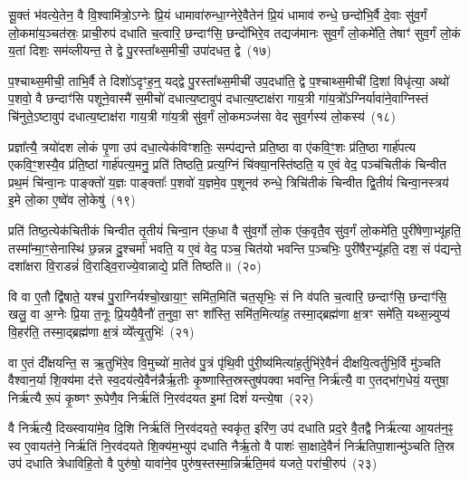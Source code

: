सू॒क्तं भ॑वत्ये॒तेन॒ वै वि॒श्वामि॑त्रो॒\-ऽग्नेः प्रि॒यं धामावा॑रुन्धा॒ग्नेरे॒वैतेन॑ प्रि॒यं धामाव॑ रुन्धे॒ छन्दो॑भि॒र्वै दे॒वाः सु॑व॒र्गं लो॒कमा॑य॒ञ्चत॑स्रः॒ प्राची॒रुप॑ दधाति च॒त्वारि॒ छन्दाꣳ॑सि॒ छन्दो॑भिरे॒व तद्यज॑मानः सुव॒र्गं लो॒कमे॑ति॒ तेषाꣳ॑ सुव॒र्गं लो॒कं य॒तां दिशः॒ सम॑व्लीयन्त॒ ते द्वे पु॒रस्ता᳚थ्स॒मीची॒ उपा॑दधत॒ द्वे~(१७)

प॒श्चाथ्स॒मीची॒ ताभि॒र्वै ते दिशो॑\-ऽदृꣳह॒न्॒ यद्द्वे पु॒रस्ता᳚थ्स॒मीची॑ उप॒दधा॑ति॒ द्वे प॒श्चाथ्स॒मीची॑ दि॒शां विधृ॑त्या॒ अथो॑ प॒शवो॒ वै छन्दाꣳ॑सि पशूने॒वास्मै॑ स॒मीचो॑ दधात्य॒ष्टावुप॑ दधात्य॒ष्टाक्ष॑रा गाय॒त्री गा॑य॒त्रो᳚\-ऽग्निर्यावा॑ने॒वाग्निस्तं चि॑नुते॒\-ऽष्टावुप॑ दधात्य॒ष्टाक्ष॑रा गाय॒त्री गा॑य॒त्री सु॑व॒र्गं लो॒कमञ्ज॑सा वेद सुव॒र्गस्य॑ लो॒कस्य॑~(१८)

प्रज्ञा᳚त्यै॒ त्रयो॑दश लोकं पृ॒णा उप॑ दधा॒त्येक॑विꣳशतिः॒ सम्प॑द्यन्ते प्रति॒ष्ठा वा ए॑कवि॒ꣳ॒शः प्र॑ति॒ष्ठा गार्\mbox{}ह॑पत्य एकवि॒ꣳ॒शस्यै॒व प्र॑ति॒ष्ठां गार्\mbox{}ह॑पत्य॒मनु॒ प्रति॑ तिष्ठति॒ प्रत्य॒ग्निं चि॑क्या॒नस्ति॑ष्ठति॒ य ए॒वं वेद॒ पञ्च॑चितीकं चिन्वीत प्रथ॒मं चि॑न्वा॒नः पाङ्क्तो॑ य॒ज्ञः पाङ्क्ताः᳚ प॒शवो॑ य॒ज्ञमे॒व प॒शूनव॑ रुन्धे॒ त्रिचि॑तीकं चिन्वीत द्वि॒तीयं॑ चिन्वा॒नस्त्रय॑ इ॒मे लो॒का ए॒ष्वे॑व लो॒केषु॑~(१९)

प्रति॑ तिष्ठ॒त्येक॑चितीकं चिन्वीत तृ॒तीयं॑ चिन्वा॒न ए॑क॒धा वै सु॑व॒र्गो लो॒क ए॑क॒वृतै॒व सु॑व॒र्गं लो॒कमे॑ति॒ पुरी॑षेणा॒भ्यू॑हति॒ तस्मा᳚न्मा॒ꣳ॒सेनास्थि॑ छ॒न्नन्न दु॒श्चर्मा॑ भवति॒ य ए॒वं वेद॒ पञ्च॒ चित॑यो भवन्ति प॒ञ्चभिः॒ पुरी॑षैर॒भ्यू॑हति॒ दश॒ सं प॑द्यन्ते॒ दशा᳚क्षरा वि॒राडन्नं॑ वि॒राड्वि॒राज्ये॒वान्नाद्ये॒ प्रति॑ तिष्ठति॥~(२०)

{}%

वि वा ए॒तौ द्वि॑षाते॒ यश्च॑ पु॒राग्निर्यश्चो॒खाया॒ꣳ॒ समि॑त॒मिति॑ चत॒सृभिः॒ सं नि व॑पति च॒त्वारि॒ छन्दाꣳ॑सि॒ छन्दाꣳ॑सि॒ खलु॒ वा अ॒ग्नेः प्रि॒या त॒नूः प्रि॒ययै॒वैनौ॑ त॒नुवा॒ सꣳ शा᳚स्ति॒ समि॑त॒मित्या॑ह॒ तस्मा॒द्ब्रह्म॑णा क्ष॒त्रꣳ समे॑ति॒ यथ्स॒न्न्युप्य॑ वि॒हर॑ति॒ तस्मा॒द्ब्रह्म॑णा क्ष॒त्रं व्ये᳚त्यृ॒तुभिः॑~(२१)

वा ए॒तं दी᳚क्षयन्ति॒ स ऋ॒तुभि॑रे॒व वि॒मुच्यो॑ मा॒तेव॑ पु॒त्रं पृ॑थि॒वी पु॑री॒ष्य॑मित्या॑ह॒र्तुभि॑रे॒वैनं॑ दीक्षयि॒त्वर्तुभि॒र्वि मु॑ञ्चति वैश्वान॒र्या शि॒क्य॑मा द॑त्ते स्व॒दय॑त्ये॒वैन॑न्नैर्\mbox{}ऋ॒तीः कृ॒ष्णास्ति॒स्रस्तुष॑पक्वा भवन्ति॒ निर्\mbox{}ऋ॑त्यै॒ वा ए॒तद्भा॑ग॒धेयं॒ यत्तुषा॒ निर्\mbox{}ऋ॑त्यै रू॒पं कृ॒ष्णꣳ रू॒पेणै॒व निर्\mbox{}ऋ॑तिं नि॒रव॑दयत इ॒मां दिशं॑ यन्त्ये॒षा~(२२)

वै निर्\mbox{}ऋ॑त्यै॒ दिख्स्वाया॑मे॒व दि॒शि निर्\mbox{}ऋ॑तिं नि॒रव॑दयते॒ स्वकृ॑त॒ इरि॑ण॒ उप॑ दधाति प्रद॒रे वै॒तद्वै निर्\mbox{}ऋ॑त्या आ॒यत॑न॒ꣴ॒ स्व ए॒वायत॑ने॒ निर्\mbox{}ऋ॑तिं नि॒रव॑दयते शि॒क्य॑म॒भ्युप॑ दधाति नैर्\mbox{}ऋ॒तो वै पाशः॑ सा॒क्षादे॒वैनं॑ निर्\mbox{}ऋतिपा॒शान्मु॑ञ्चति ति॒स्र उप॑ दधाति त्रेधाविहि॒तो वै पुरु॑षो॒ यावा॑ने॒व पुरु॑ष॒स्तस्मा॒न्निर्\mbox{}ऋ॑ति॒मव॑ यजते॒ परा॑ची॒रुप॑~(२३)

